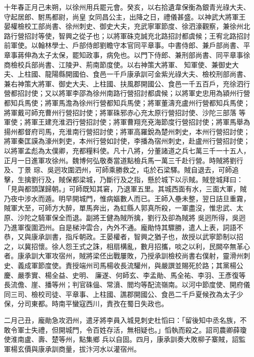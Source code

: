 \begin{pinyinscope}
 十年春正月己未朔，以徐州用兵罷元會。癸亥，以右拾遺韋保衡為銀青光祿大夫、守起居郎、駙馬都尉，尚皇
 女同昌公主，出降之日，禮儀甚盛。以神武大將軍王晏權檢校工部尚書、徐州刺史、御史大夫，充武寧軍節度、徐泗濠觀察，兼徐州北路行營招討等使，智興之從子也；以將軍硃克誠充北路招討都虞候；王宥北路招討前軍使。以翰林學士、戶部侍郎劉瞻守本官同平章事。中書侍郎、兼戶部尚書、平章事蔣伸為太子太保，罷知政事，病免也。以門下侍郎、兼刑部尚書、同平章事徐商檢校兵部尚書、江陵尹、荊南節度使。以右神策大將軍、
 知軍使、兼御史大夫、上柱國、龍陽縣開國伯、食邑一千戶康承訓可金紫光祿大夫、檢校刑部尚書、兼右神策大將軍、御史大夫、上柱國、扶風郡開國公、食邑一千五百戶，充徐泗行營都招討使；又以將軍李邵為徐州南路行營招討都虞候；以將軍史忠用為潁州行營都知兵馬使；將軍馬澹為徐州行營都知兵馬使；將軍董濤充盧州行營都知兵馬使；將軍戴可師充曹州行營招討使；將軍硃邪赤心充太原行營招討使、沙陀三部落
 等軍使；將軍王建充淮泗行營招討使；將軍曹翔充兗海節度行營招討使；將軍馬舉為揚州都督府司馬，充淮南行營招討使；將軍高羅銳為楚州刺史，本州行營招討使；將軍秦匡謨為濠州刺吏，本州行營如討使，李播為宿州刺史，赴盧州行營招討使；以將軍孟彪為太僕卿，充都糧料使。凡十八將，分董諸道之兵七萬三千一十五人，正月一日進軍攻徐州。魏博何弘敬奏當道點檢兵馬一萬三千赴行營。時賊將劉行及、丁景
 琮、吳迥攻圍泗州，可師乘勝救之，屯於石梁驛。賊自退去，可師追擊，生擒劉行及，賊保都梁城，乃斷行及之指，懸於城下以示賊。賊登城拜曰：「見與都頭謀歸朝。」可師既知其窘，乃退軍五里。其城西面有水，三面大軍，賊乃夜中涉水而遁。明早開城門，惟病嫗數人而已。王師入壘未整，翌日詰旦重霧，賊軍大至，可師方大醉，單馬奔出，為虹縣人郭真所殺，一軍盡沒，惟忠武、太原、沙陀之騎軍保全而退。副將王健為賊所擒，劉行及卻為賊將
 吳迥所得，吳迥乃進軍復圍泗州。自是梯沖雲合，內外不通。龐勛恃其驟勝，遣人上表，詞語不恭，又與康承訓書，指斥朝政。王晏權者，智興之猶子也，故授以武寧節制以招之，以冀招懷。徐人怨王式之誅，相扇構亂，數月招攜，啖之以利，民闕卒無革心者。康承訓大軍攻宿州，賊將梁伾出戰屢敗，乃授承訓檢校尚書右僕射，靈滑州刺史、義成軍節度使。責授端州司馬楊收長流驩州，與嚴譔並賜死於路；其黨楊公慶、嚴季實、楊全益、史明、
 廉遂、何師玄、李孟勛、馬全祐、李羽、王彥復等長流儋、崖、播等州；判官硃偘、常濆、閻均等配流嶺南。以河中節度使、開府儀同三司、檢校司徒、平章事、上柱國、譙郡開國公、食邑二千戶夏候孜為太子少保，分司東都。時南平蠻寇西川，責孜在蜀日失政也。



 二月己丑，龐勛急攻泗州，遣牙將李員入城見刺史杜慆曰：「留後知中丞名族，不敢令軍士失禮，但開城門，令百姓存活，無相疑也。」慆執而殺之。詔司農卿薛瓊使淮南盧、壽、楚等州，點集鄉
 兵以自固。四月，康承訓奏大敗柳子寨賊，詔監軍楊玄價與康承訓商量，拔汴河水以灌宿州。




\end{pinyinscope}
